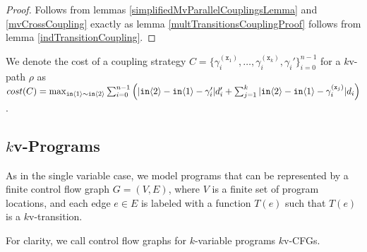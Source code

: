 \begin{proof}
    Follows from lemmas \ref{simplifiedMvParallelCouplingsLemma} and \ref{mvCrossCoupling} exactly as lemma \ref{multTransitionsCouplingProof} follows from lemma \ref{indTransitionCoupling}.
\end{proof}

We denote the cost of a coupling strategy $C=\{\gamma_i^{(\texttt{x}_1)},\ldots, \gamma_i^{(\texttt{x}_k)}, \gamma_i'\}_{i=0}^{n-1}$ for a $k$v-path $\rho$ as $cost(C) = \max_{\texttt{in}\langle1 \rangle\sim\texttt{in}\langle2 \rangle}\sum_{i=0}^{n-1}\left(|\texttt{in}\langle2 \rangle-\texttt{in}\langle1 \rangle-\gamma_i'|d_i'+\sum_{j=1}^k|\texttt{in}\langle2 \rangle-\texttt{in}\langle1 \rangle-\gamma_i^{(\texttt{x}_j)}|d_i\right)$.

\subsection{$k$v-Programs}

As in the single variable case, we model programs that can be represented by a finite control flow graph $G = (V, E)$, where $V$ is a finite set of program locations, and each edge $e\in E$ is labeled with a function $T(e)$ such that $T(e)$ is a $k$v-transition. 

For clarity, we call control flow graphs for $k$-variable programs $k$v-CFGs. 

